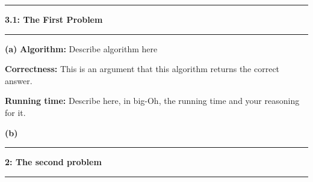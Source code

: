 \documentclass[11pt]{article}
\newcommand\question[2]{\vspace{.25in}\hrule\textbf{#1: #2}\vspace{.5em}\hrule\vspace{.10in}}
\renewcommand\part[1]{\vspace{.10in}\textbf{(#1)}}
\newcommand\algorithm{\vspace{.10in}\textbf{Algorithm: }}
\newcommand\correctness{\vspace{.10in}\textbf{Correctness: }}
\newcommand\runtime{\vspace{.10in}\textbf{Running time: }}
\begin{document}
\raggedright
\newcommand\NAME{Sean Connor}  %
\newcommand\HWNUM{2}              %


\question{3.1}{The First Problem} 

\part{a} \algorithm Describe algorithm here

\correctness This is an argument  that this algorithm returns the correct answer.

\runtime Describe here, in big-Oh, the running time and your reasoning for it.

\part{b}

\question{2}{The second problem}
\end{document}
